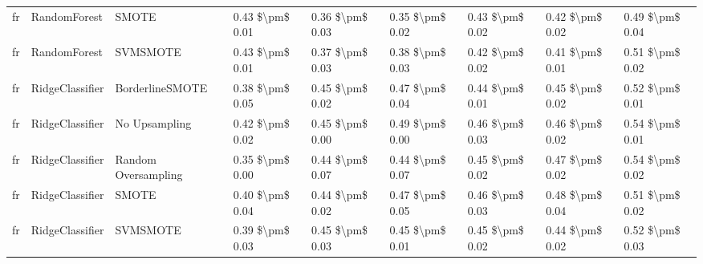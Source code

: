 \begin{tabular}{lllllllll}
      fr &                    RandomForest &                         SMOTE & 0.43 \$\textbackslash pm\$ 0.01 &           0.36 \$\textbackslash pm\$ 0.03 &       0.35 \$\textbackslash pm\$ 0.02 &        0.43 \$\textbackslash pm\$ 0.02 &                         0.42 \$\textbackslash pm\$ 0.02 &     0.49 \$\textbackslash pm\$ 0.04 \\
      fr &                    RandomForest &                      SVMSMOTE & 0.43 \$\textbackslash pm\$ 0.01 &           0.37 \$\textbackslash pm\$ 0.03 &       0.38 \$\textbackslash pm\$ 0.03 &        0.42 \$\textbackslash pm\$ 0.02 &                         0.41 \$\textbackslash pm\$ 0.01 &     0.51 \$\textbackslash pm\$ 0.02 \\
      fr &                 RidgeClassifier &               BorderlineSMOTE & 0.38 \$\textbackslash pm\$ 0.05 &           0.45 \$\textbackslash pm\$ 0.02 &       0.47 \$\textbackslash pm\$ 0.04 &        0.44 \$\textbackslash pm\$ 0.01 &                         0.45 \$\textbackslash pm\$ 0.02 &     0.52 \$\textbackslash pm\$ 0.01 \\
      fr &                 RidgeClassifier &                 No Upsampling & 0.42 \$\textbackslash pm\$ 0.02 &           0.45 \$\textbackslash pm\$ 0.00 &       0.49 \$\textbackslash pm\$ 0.00 &        0.46 \$\textbackslash pm\$ 0.03 &                         0.46 \$\textbackslash pm\$ 0.02 &     0.54 \$\textbackslash pm\$ 0.01 \\
      fr &                 RidgeClassifier &           Random Oversampling & 0.35 \$\textbackslash pm\$ 0.00 &           0.44 \$\textbackslash pm\$ 0.07 &       0.44 \$\textbackslash pm\$ 0.07 &        0.45 \$\textbackslash pm\$ 0.02 &                         0.47 \$\textbackslash pm\$ 0.02 &     0.54 \$\textbackslash pm\$ 0.02 \\
      fr &                 RidgeClassifier &                         SMOTE & 0.40 \$\textbackslash pm\$ 0.04 &           0.44 \$\textbackslash pm\$ 0.02 &       0.47 \$\textbackslash pm\$ 0.05 &        0.46 \$\textbackslash pm\$ 0.03 &                         0.48 \$\textbackslash pm\$ 0.04 &     0.51 \$\textbackslash pm\$ 0.02 \\
      fr &                 RidgeClassifier &                      SVMSMOTE & 0.39 \$\textbackslash pm\$ 0.03 &           0.45 \$\textbackslash pm\$ 0.03 &       0.45 \$\textbackslash pm\$ 0.01 &        0.45 \$\textbackslash pm\$ 0.02 &                         0.44 \$\textbackslash pm\$ 0.02 &     0.52 \$\textbackslash pm\$ 0.03 \\

\end{tabular}
